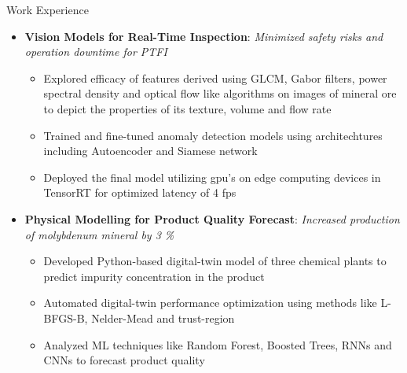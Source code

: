 \documentclass{resume} %
\begin{document}
\begin{rSection}{Work Experience}
\begin{itemize}[leftmargin=1em,rightmargin=0.2in ,itemsep=-5pt, topsep=-5pt, before={\vspace{0.0ex}},after=\vspace{-1ex}]
 \item \begingroup \spaceskip=2.0pt \textbf{Vision Models for Real-Time Inspection}: \emph{Minimized safety risks and operation downtime for PTFI}\endgroup
		\begin{itemize}[leftmargin=0em,itemsep=-6pt, topsep=-5pt, before={\vspace{-0.3ex}},after=\vspace{0.5ex}]
		\item  \begingroup
			\spaceskip=2.5pt
				Explored efficacy of features derived using GLCM, Gabor filters, power spectral density and optical flow like algorithms on images of mineral ore to depict the properties of its texture, volume and flow rate
			\endgroup
		\item \begingroup
			\spaceskip=2.4pt
				Trained and fine-tuned anomaly detection models using architechtures including Autoencoder and Siamese network
				\endgroup
		\begingroup \spaceskip=2.4pt \item Deployed the final model utilizing gpu's on edge computing devices in TensorRT for optimized latency of 4 fps\endgroup
		\end{itemize}

\item \textbf{Physical Modelling for Product Quality Forecast}: \emph{Increased production of molybdenum mineral by 3 \%}
		\begin{itemize}[leftmargin=0em,itemsep=-6pt, topsep=-5pt, before={\vspace{-0.3ex}},after=\vspace{0.5ex}]
		\item \begingroup
			\spaceskip=2.0pt
				Developed Python-based digital-twin model of three chemical plants to predict impurity concentration in the product
			\endgroup
		\item \begingroup
			\spaceskip=2.0pt
			Automated digital-twin performance optimization using methods like L-BFGS-B, Nelder-Mead and trust-region
		\endgroup
\item Analyzed ML techniques like Random Forest, Boosted Trees, RNNs and CNNs to forecast product quality
		\end{itemize}



\end{itemize}
\end{rSection}
\end{document}
